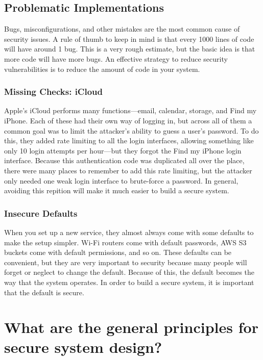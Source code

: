 \subsection{Problematic Implementations}
Bugs, misconfigurations, and other mistakes are the most common cause of security issues. A rule of thumb to keep in mind is that every 1000 lines of code will have around 1 bug. This is a very rough estimate, but the basic idea is that more code will have more bugs. An effective strategy to reduce security vulnerabilities is to reduce the amount of code in your system.

\subsubsection{Missing Checks: iCloud}
Apple's iCloud performs many functions---email, calendar, storage, and Find my iPhone. Each of these had their own way of logging in, but across all of them a common goal was to limit the attacker's ability to guess a user's password. To do this, they added rate limiting to all the login interfaces, allowing something like only 10 login attempts per hour---but they forgot the Find my iPhone login interface.\cite{icloud} Because this authentication code was duplicated all over the place, there were many places to remember to add this rate limiting, but the attacker only needed one weak login interface to brute-force a password. In general, avoiding this repition will make it much easier to build a secure system.

\subsubsection{Insecure Defaults}
When you set up a new service, they almost always come with some defaults to make the setup simpler. Wi-Fi routers come with default passwords, AWS S3 buckets come with default permissions, and so on. These defaults can be convenient, but they are very important to security because many people will forget or neglect to change the default. Because of this, the default becomes the way that the system operates. In order to build a secure system, it is important that the default is secure.

\section{What are the general principles for secure system design?}
